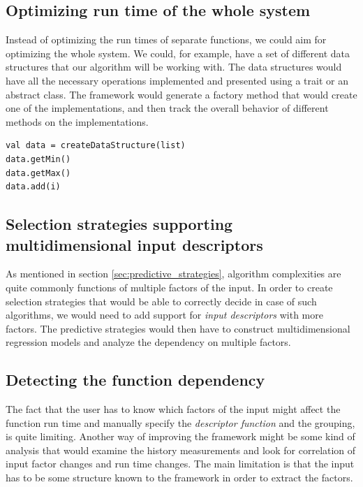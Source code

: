 \subsection{Optimizing run time of the whole system}

Instead of optimizing the run times of separate functions, we could aim for optimizing the whole system. We could, for example, have a set of different data structures that our algorithm will be working with. The data structures would have all the necessary operations implemented and presented using a trait or an abstract class. The framework would generate a factory method that would create one of the implementations, and then track the overall behavior of different methods on the implementations. 

\lstset{style=Scala}
\begin{lstlisting}
val data = createDataStructure(list)
data.getMin()
data.getMax()
data.add(i)
\end{lstlisting}

\subsection{Selection strategies supporting multidimensional input descriptors}

As mentioned in section \ref{sec:predictive_strategies}, algorithm complexities are quite commonly functions of multiple factors of the input. In order to create selection strategies that would be able to correctly decide in case of such algorithms, we would need to add support for \textit{input descriptors} with more factors. The predictive strategies would then have to construct multidimensional regression models and analyze the dependency on multiple factors.

\subsection{Detecting the function dependency}

The fact that the user has to know which factors of the input might affect the function run time and manually specify the \textit{descriptor function} and the grouping, is quite limiting. Another way of improving the framework might be some kind of analysis that would examine the history measurements and look for correlation of input factor changes and run time changes. The main limitation is that the input has to be some structure known to the framework in order to extract the factors.

